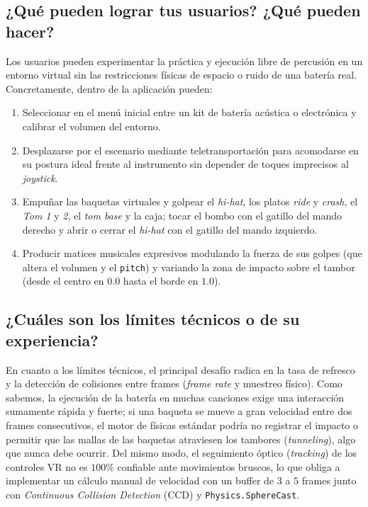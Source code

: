 \documentclass{article}
\begin{document}
\subsection{¿Qué pueden lograr tus usuarios? ¿Qué pueden hacer?}
Los usuarios pueden experimentar la práctica y ejecución libre de percusión en un entorno virtual sin las restricciones físicas de espacio o ruido de una batería real. Concretamente, dentro de la aplicación pueden:
\begin{enumerate}
    \item Seleccionar en el menú inicial entre un kit de batería acústica o electrónica y calibrar el volumen del entorno.
    \item Desplazarse por el escenario mediante teletransportación para acomodarse en su postura ideal frente al instrumento sin depender de toques imprecisos al \textit{joystick}.
    \item Empuñar las baquetas virtuales y golpear el \textit{hi-hat}, los platos \textit{ride} y \textit{crash}, el \textit{Tom 1} y \textit{2}, el \textit{tom base} y la caja; tocar el bombo con el gatillo del mando derecho y abrir o cerrar el \textit{hi-hat} con el gatillo del mando izquierdo.
    \item Producir matices musicales expresivos modulando la fuerza de sus golpes (que altera el volumen y el \texttt{pitch}) y variando la zona de impacto sobre el tambor (desde el centro en $0.0$ hasta el borde en $1.0$).
\end{enumerate}

\subsection{¿Cuáles son los límites técnicos o de su experiencia?}
En cuanto a los límites técnicos, el principal desafío radica en la tasa de refresco y la detección de colisiones entre frames (\textit{frame rate} y muestreo físico). Como sabemos, la ejecución de la batería en muchas canciones exige una interacción sumamente rápida y fuerte; si una baqueta se mueve a gran velocidad entre dos frames consecutivos, el motor de físicas estándar podría no registrar el impacto o permitir que las mallas de las baquetas atraviesen los tambores (\textit{tunneling}), algo que nunca debe ocurrir. Del mismo modo, el seguimiento óptico (\textit{tracking}) de los controles VR no es $100\%$ confiable ante movimientos bruscos, lo que obliga a implementar un cálculo manual de velocidad con un buffer de $3$ a $5$ frames junto con \textit{Continuous Collision Detection} (CCD) y \texttt{Physics.SphereCast}.
\end{document}
